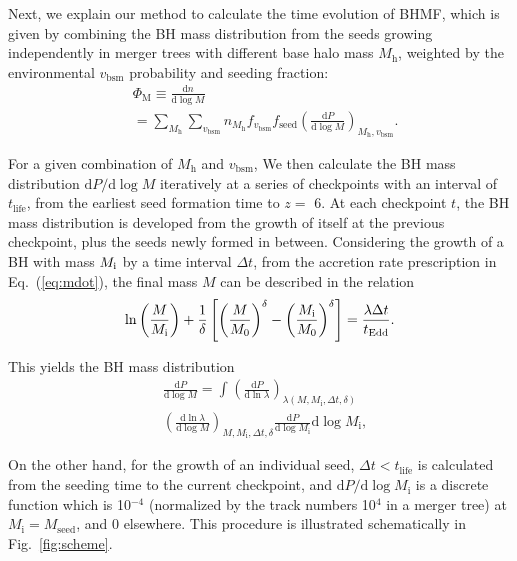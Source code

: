 \documentclass[twocolumn, twocolappendix]{aastex63}
\newcommand{\Mh}{M_\mathrm{h}}
\newcommand{\vbsm}{v_\mathrm{bsm}}
\newcommand{\tlife}{t_\mathrm{life}}
\newcommand{\fseed}{f_\mathrm{seed}}
\newcommand{\tEdd}{t_\mathrm{Edd}}
\newcommand{\Nt}{N_\mathrm{t}}
\newcommand{\D}{\mathrm{d}}
\begin{document}
\begin{CJK*}{UTF8}{gbsn}
Next, we explain our method to calculate the time evolution of BHMF, 
which is given by combining the BH mass distribution from the seeds growing independently in merger trees
with different base halo mass $\Mh$,
weighted by the environmental $\vbsm$ probability and seeding fraction: 
\begin{align}
& \Phi_\mathrm{M} \equiv \frac{\D n}{\D \log M}  \nonumber \\
& =\sum_{\Mh}\sum_{\vbsm} n_{\Mh} f_{\vbsm} {\fseed} \left(\frac{\D P}{\D \log M}\right)_{\Mh, \vbsm}.
\end{align}

For a given combination of $\Mh$ and $\vbsm$, 
We then calculate the BH mass distribution $\D P/\D\log M$ iteratively 
at a series of checkpoints with an interval of $\tlife$, 
from the earliest seed formation time to $z=$ 6. 
At each checkpoint $t$, the BH mass distribution is developed from the growth of itself 
at the previous checkpoint, plus the seeds newly formed in between.
Considering the growth of a BH with mass $M_{\rm i}$ by a time interval $\Delta t$, 
from the accretion rate prescription in Eq.~(\ref{eq:mdot}), the final mass $M$ can be described in the relation 
\begin{equation}
  \label{eq:mi2m}
  \ln \left(\frac{M} {M_{\rm i}}\right) + \frac{1}{\delta} 
  \left[ \left(\frac{M}{M_0}\right)^\delta - \left(\frac{M_{\rm i}}{M_0}\right)^\delta \right]
  = \frac{\lambda \Delta t}{\tEdd}.
\end{equation}

This yields the BH mass distribution 
\begin{align}
  \label{eq:dpdm}
  & \frac{\D P}{\D \log M} = \int_{}^{} 
   \left(\frac{\D P}{\D \ln \lambda}\right)_{\lambda(M, M_\mathrm{i},\Delta t, \delta)} \nonumber \\
  & \left(\frac{\D \ln \lambda}{\D \log M} \right)_{M, M_\mathrm{i},\Delta t, \delta}
  \frac{\D P}{\D \log M_\mathrm{i}} \D\log M_\mathrm{i},
\end{align}


\fi



On the other hand, for the growth of an individual seed, 
$\Delta t < \tlife$ is calculated from the seeding time to the current checkpoint,
and $ \D P/\D \log M_\mathrm{i}$ is a discrete function which is 10$^{-4}$ 
(normalized by the track numbers 10$^4$ in a merger tree) at $M_\mathrm{i} = M_\mathrm{seed}$, 
and 0 elsewhere.
This procedure is illustrated schematically in Fig.~\ref{fig:scheme}. 



\end{CJK*}
\end{document}
